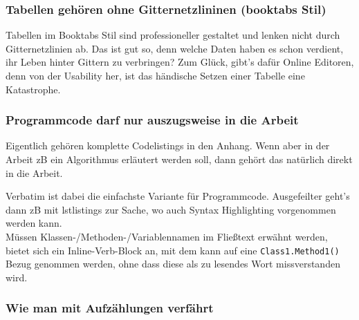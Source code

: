 \subsubsection{Tabellen gehören ohne Gitternetzlininen (booktabs Stil)}
Tabellen im Booktabs Stil sind professioneller gestaltet und lenken nicht durch Gitternetzlinien ab. Das ist gut so, denn welche Daten haben es schon verdient, ihr Leben hinter Gittern zu verbringen?
Zum Glück, gibt's dafür Online Editoren, denn von der Usability her, ist das händische Setzen einer Tabelle eine Katastrophe.




\subsubsection{Programmcode darf nur auszugsweise in die Arbeit}

Eigentlich gehören komplette Codelistings in den Anhang.
Wenn aber in der Arbeit zB ein Algorithmus erläutert werden soll, dann gehört das natürlich direkt in die Arbeit.

Verbatim ist dabei die einfachste Variante für Programmcode.
Ausgefeilter geht's dann zB mit lstlistings zur Sache, wo auch Syntax Highlighting vorgenommen werden kann. \\

Müssen Klassen-/Methoden-/Variablennamen im Fließtext erwähnt werden, bietet sich ein Inline-Verb-Block an, mit dem kann auf eine \verb|Class1.Method1()| Bezug genommen werden, ohne dass diese als zu lesendes Wort missverstanden wird. %

\subsubsection{Wie man mit Aufzählungen verfährt}

